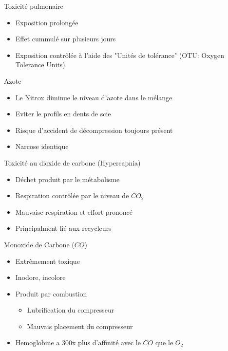 \begin{frame}{Toxicité pulmonaire}  
	\begin{itemize}
		\item Exposition prolongée
		\item Effet cummulé sur plusieurs jours
		\item Exposition contrôlée à l'aide des "Unités  de tolérance" (OTU: Oxygen Tolerance Units)
	\end{itemize}
\end{frame}

\begin{frame}{Azote}  
	\begin{itemize}
		\item Le Nitrox diminue le niveau d'azote dans le mélange
		\item Eviter le profils en dents de scie
		\item Risque d'accident de décompression toujours présent
		\item Narcose identique
	\end{itemize}
\end{frame}

\begin{frame}{Toxicité au dioxide de carbone (Hypercapnia)}  
	\begin{itemize}
		\item Déchet produit par le métabolisme
		\item Respiration contrôlée par le niveau de $CO_2$
		\item Mauvaise respiration et effort prononcé
		\item Principalment lié aux recycleurs
	\end{itemize}
\end{frame}

\begin{frame}{Monoxide de Carbone ($CO$)}
	\begin{itemize}
		\item Extrêmement toxique
		\item Inodore, incolore
		\item Produit par combustion
		\begin{itemize}
			\item Lubrification du compresseur
			\item Mauvais placement du compresseur
		\end{itemize}
		\item Hemoglobine a 300x plus d'affinité avec le $CO$ que le $O_2$
	\end{itemize}
\end{frame}